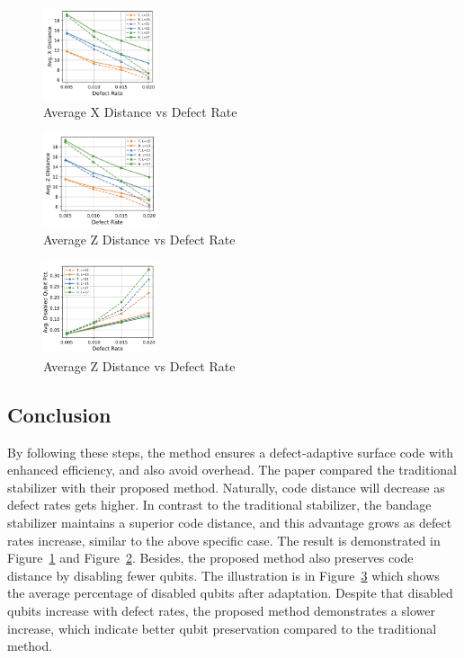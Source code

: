 \begin{figure}[h]
    \centering
    \includegraphics[width=0.3\textwidth]{sections/4_stabilizer/Fig3c.png}
    \caption{Average X Distance vs Defect Rate}
    \label{fig:Fig3c}
\end{figure}

\begin{figure}[h]
    \centering
    \includegraphics[width=0.3\textwidth]{sections/4_stabilizer/Fig3d.png}
    \caption{Average Z Distance vs Defect Rate}
    \label{fig:Fig3d}
\end{figure}

\begin{figure}[h]
    \centering
    \includegraphics[width=0.3\textwidth]{sections/4_stabilizer/Fig3e.png}
    \caption{Average Z Distance vs Defect Rate}
    \label{fig:Fig3e}
\end{figure}

\subsection{Conclusion}
By following these steps, the method ensures a defect-adaptive surface code with enhanced efficiency, and also avoid overhead. The paper compared the traditional stabilizer with their proposed method. Naturally, code distance will decrease as defect rates gets higher. In contrast to the traditional stabilizer, the bandage stabilizer maintains a superior code distance, and this advantage grows as defect rates increase, similar to the above specific case. The result is demonstrated in Figure~\ref{fig:Fig3c} and Figure~\ref{fig:Fig3d}. Besides, the proposed method also preserves code distance by disabling fewer qubits. The illustration is in Figure~\ref{fig:Fig3e} which shows the average percentage of disabled qubits after adaptation. Despite that disabled qubits increase with defect rates, the proposed method demonstrates a slower increase, which indicate better qubit preservation compared to the traditional method.